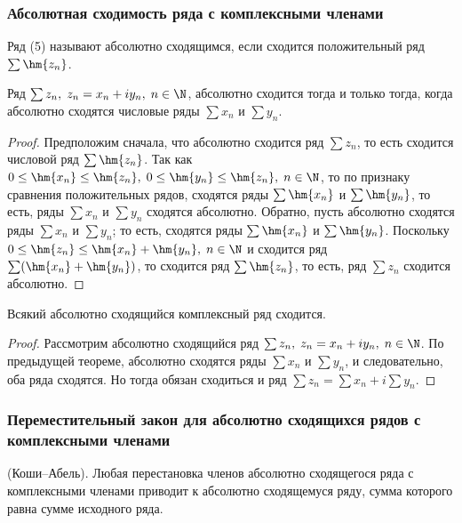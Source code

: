 \documentclass[a4paper]{article}
\newenvironment{imp*}{\par\vskip\theoremskip\textbf{Следствие.}\normalfont \itshape}{\par\vskip\theoremskip}
\begin{document}
\subsubsection{Абсолютная сходимость ряда с комплексными членами}

Ряд (5) называют абсолютно сходящимся, если сходится положительный
ряд $\sum \hm{z_n}$.

\begin{theorem}
Ряд $\sum z_n, \; z_n=x_n+iy_n, \; n\in\N$, абсолютно сходится тогда
и только тогда, когда абсолютно сходятся числовые ряды $\sum x_n$ и
$\sum y_n$.
\end{theorem}

\begin{proof}
Предположим сначала, что абсолютно сходится ряд $\sum z_n$, то есть
сходится числовой ряд $\sum\hm{z_n}$. Так как
$0\le\hm{x_n}\le\hm{z_n}, \; 0\le\hm{y_n}\le\hm{z_n}, \; n\in\N$, то
по признаку сравнения положительных рядов, сходятся ряды
$\sum\hm{x_n}$ и $\sum\hm{y_n}$, то есть, ряды $\sum x_n$ и $\sum
y_n$ сходятся абсолютно. Обратно, пусть абсолютно сходятся ряды
$\sum x_n$ и $\sum y_n$; то есть, сходятся ряды $\sum\hm{x_n}$ и
$\sum\hm{y_n}$. Поскольку $0\le\hm{z_n}\le\hm{x_n}+\hm{y_n}, \;
n\in\N$ и сходится ряд $\sum(\hm{x_n}+\hm{y_n})$, то сходится ряд
$\sum\hm{z_n}$, то есть, ряд $\sum z_n$ сходится абсолютно.
\end{proof}

\begin{imp*}
Всякий абсолютно сходящийся комплексный ряд сходится.
\end{imp*}

\begin{proof}
Рассмотрим абсолютно сходящийся ряд $\sum z_n, \; z_n=x_n+iy_n, \;
n\in\N$. По предыдущей теореме, абсолютно сходятся ряды $\sum x_n$ и
$\sum y_n$, и следовательно, оба ряда сходятся. Но тогда обязан
сходиться и ряд $\sum z_n = \sum x_n+i\sum y_n$.
\end{proof}

\subsubsection{Переместительный закон для абсолютно сходящихся рядов
с комплексными членами}

\begin{theorem}
(Коши--Абель). Любая перестановка членов абсолютно сходящегося ряда
с комплексными членами приводит к абсолютно сходящемуся ряду, сумма
которого равна сумме исходного ряда.
\end{theorem}
\end{document}
